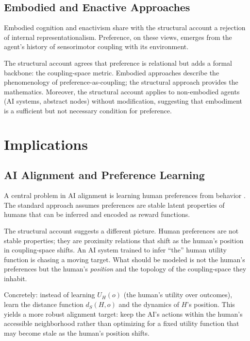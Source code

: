 \documentclass[12pt,a4paper]{article}
\begin{document}
\subsection{Embodied and Enactive Approaches}

Embodied cognition \citep{varela1991} and enactivism \citep{thompson2007} share with the structural account a rejection of internal representationalism. Preference, on these views, emerges from the agent's history of sensorimotor coupling with its environment.

The structural account agrees that preference is relational but adds a formal backbone: the coupling-space metric. Embodied approaches describe the phenomenology of preference-as-coupling; the structural approach provides the mathematics. Moreover, the structural account applies to non-embodied agents (AI systems, abstract nodes) without modification, suggesting that embodiment is a sufficient but not necessary condition for preference.

\section{Implications}

\subsection{AI Alignment and Preference Learning}

A central problem in AI alignment is learning human preferences from behavior \citep{christiano2017, russell2019}. The standard approach assumes preferences are stable latent properties of humans that can be inferred and encoded as reward functions.

The structural account suggests a different picture. Human preferences are not stable properties; they are proximity relations that shift as the human's position in coupling-space shifts. An AI system trained to infer ``the'' human utility function is chasing a moving target. What should be modeled is not the human's preferences but the human's \emph{position} and the topology of the coupling-space they inhabit.

Concretely: instead of learning $U_H(o)$ (the human's utility over outcomes), learn the distance function $d_S(H, o)$ and the dynamics of $H$'s position. This yields a more robust alignment target: keep the AI's actions within the human's accessible neighborhood rather than optimizing for a fixed utility function that may become stale as the human's position shifts.
\end{document}

